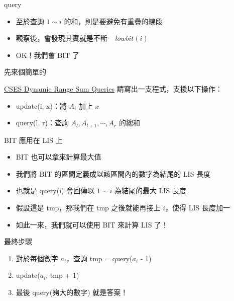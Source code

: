 \documentclass[aspectratio=169]{beamer}
\begin{document}
    \begin{frame}{query}
        \begin{itemize}
            \item 至於查詢 $1 \sim i$ 的和，則是要避免有重疊的線段
            \item 觀察後，會發現其實就是不斷 $- lowbit(i)$
            \item OK！我們會 BIT 了
        \end{itemize}
    \end{frame}

    \begin{frame}{先來個簡單的}
        \begin{block}{\href{https://cses.fi/problemset/task/1648}{CSES Dynamic Range Sum Queries}}
            請寫出一支程式，支援以下操作：\\
            \begin{itemize}
                \item update(i, x)：將 $A_i$ 加上 $x$
                \item query(l, r)：查詢 $A_l, A_{l+1}, \cdots, A_r$ 的總和
            \end{itemize}
        \end{block}
    \end{frame}

    \begin{frame}{BIT 應用在 LIS 上}
        \begin{itemize}
            \item<1-> BIT 也可以拿來計算最大值
            \item<2-> 我們將 BIT 的區間定義成以該區間內的數字為結尾的 LIS 長度
            \item<3-> 也就是 query(i) 會回傳以 $1 \sim i$ 為結尾的最大 LIS 長度
            \item<4-> 假設這是 tmp，那我們在 tmp 之後就能再接上 $i$，使得 LIS 長度加一
            \item<5-> 如此一來，我們就可以使用 BIT 來計算 LIS 了！
        \end{itemize}
    \end{frame}

    \begin{frame}{最終步驟}
        \begin{enumerate}
            \item 對於每個數字 $a_i$，查詢 tmp = query($a_i$ - 1)
            \item update($a_i$, tmp + 1)
            \item 最後 query(夠大的數字) 就是答案！
        \end{enumerate}
    \end{frame}
\end{document}
